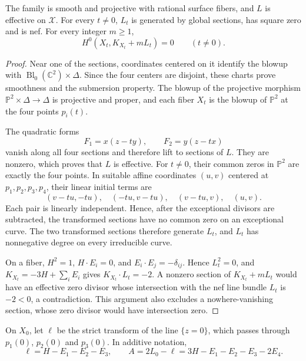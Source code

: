 \begin{lemma}\label{lem:four-point-family-adjoint-vanishing}
The family is smooth and projective with rational surface fibers, and $L$ is effective on $\mathcal X$. For every $t\ne0$, $L_t$ is generated by global sections, has square zero and is nef. For every integer $m\geq1$,
\[
 H^0(X_t,K_{X_t}+mL_t)=0\qquad(t\ne0).
\]
\end{lemma}
\begin{proof}
Near one of the sections, coordinates centered on it identify the blowup with $\operatorname{Bl}_0(\mathbb C^2)\times\Delta$. Since the four centers are disjoint, these charts prove smoothness and the submersion property. The blowup of the projective morphism $\mathbb P^2\times\Delta\to\Delta$ is projective and proper, and each fiber $X_t$ is the blowup of $\mathbb P^2$ at the four points $p_i(t)$.

The quadratic forms
\[
 F_1=x(z-ty),\qquad F_2=y(z-tx)
\]
vanish along all four sections and therefore lift to sections of $L$. They are nonzero, which proves that $L$ is effective. For $t\ne0$, their common zeros in $\mathbb P^2$ are exactly the four points. In suitable affine coordinates $(u,v)$ centered at $p_1,p_2,p_3,p_4$, their linear initial terms are
\[
 (v-tu,-tu),\quad(-tu,v-tu),\quad(v-tu,v),\quad(u,v).
\]
Each pair is linearly independent. Hence, after the exceptional divisors are subtracted, the transformed sections have no common zero on an exceptional curve. The two transformed sections therefore generate $L_t$, and $L_t$ has nonnegative degree on every irreducible curve.

On a fiber, $H^2=1$, $H\cdot E_i=0$, and $E_i\cdot E_j=-\delta_{ij}$. Hence $L_t^2=0$, and $K_{X_t}=-3H+\sum_iE_i$ gives $K_{X_t}\cdot L_t=-2$. A nonzero section of $K_{X_t}+mL_t$ would have an effective zero divisor whose intersection with the nef line bundle $L_t$ is $-2<0$, a contradiction. This argument also excludes a nowhere-vanishing section, whose zero divisor would have intersection zero.
\end{proof}

On $X_0$, let $\ell$ be the strict transform of the line $\{z=0\}$, which passes through $p_1(0)$, $p_2(0)$ and $p_3(0)$. In additive notation,
\[
 \ell=H-E_1-E_2-E_3,\qquad
 A=2L_0-\ell=3H-E_1-E_2-E_3-2E_4.
\]

